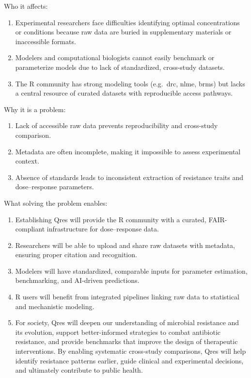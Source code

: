 \documentclass[
]{article}
\providecommand{\tightlist}{%
  \setlength{\itemsep}{0pt}\setlength{\parskip}{0pt}}
\begin{document}
Who it affects:

\begin{enumerate}
\def\labelenumi{\arabic{enumi}.}
\tightlist
\item
  Experimental researchers face difficulties identifying optimal
  concentrations or conditions because raw data are buried in
  supplementary materials or inaccessible formats.
\item
  Modelers and computational biologists cannot easily benchmark or
  parameterize models due to lack of standardized, cross-study datasets.
\item
  The R community has strong modeling tools (e.g.~drc, nlme, brms) but
  lacks a central resource of curated datasets with reproducible access
  pathways.
\end{enumerate}

Why it is a problem:

\begin{enumerate}
\def\labelenumi{\arabic{enumi}.}
\tightlist
\item
  Lack of accessible raw data prevents reproducibility and cross-study
  comparison.
\item
  Metadata are often incomplete, making it impossible to assess
  experimental context.
\item
  Absence of standards leads to inconsistent extraction of resistance
  traits and dose--response parameters.
\end{enumerate}

What solving the problem enables:

\begin{enumerate}
\def\labelenumi{\arabic{enumi}.}
\tightlist
\item
  Establishing Qres will provide the R community with a curated,
  FAIR-compliant infrastructure for dose--response data.
\item
  Researchers will be able to upload and share raw datasets with
  metadata, ensuring proper citation and recognition.
\item
  Modelers will have standardized, comparable inputs for parameter
  estimation, benchmarking, and AI-driven predictions.
\item
  R users will benefit from integrated pipelines linking raw data to
  statistical and mechanistic modeling.
\item
  For society, Qres will deepen our understanding of microbial
  resistance and its evolution, support better-informed strategies to
  combat antibiotic resistance, and provide benchmarks that improve the
  design of therapeutic interventions. By enabling systematic
  cross-study comparisons, Qres will help identify resistance patterns
  earlier, guide clinical and experimental decisions, and ultimately
  contribute to public health.
\end{enumerate}
\end{document}
